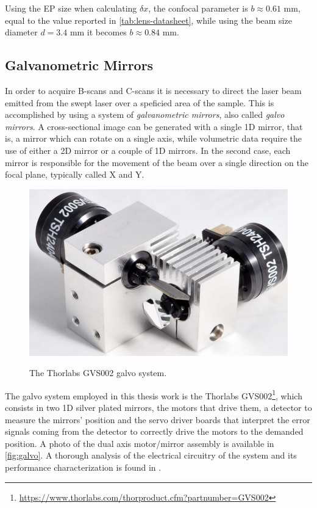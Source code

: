  
 Using the EP size when calculating $\delta x$, the confocal parameter is $b \approx 0.61$ mm, equal to the value reported in \autoref{tab:lens-datasheet}, while using the beam size diameter $d = 3.4$ mm it becomes $b \approx 0.84$ mm. 
 
 

\subsection{Galvanometric Mirrors}

In order to acquire B-scans and C-scans it is necessary to direct the laser beam emitted from the swept laser over a speficied area of the sample. This is accomplished by using a system of \emph{galvanometric mirrors}, also called \emph{galvo mirrors}. A cross-sectional image can be generated with a single 1D mirror, that is, a mirror which can rotate on a single axis, while volumetric data require the use of either a 2D mirror or a couple of 1D mirrors. In the second case, each mirror is responsible for the movement of the beam over a single direction on the focal plane, typically called X and Y. 

\begin{figure}[bth]
	\myfloatalign
	{\includegraphics[width=0.6\linewidth]{gfx/ch3/galvo}}
	\caption{The Thorlabs GVS002 galvo system.}\label{fig:galvo}
\end{figure}

The galvo system employed in this thesis work is the Thorlabs GVS002\footnote{\url{https://www.thorlabs.com/thorproduct.cfm?partnumber=GVS002}}, which consists in two 1D silver plated mirrors, the motors that drive them, a detector to measure the mirrors' position  and the servo driver boards that interpret the error signals coming from the detector to correctly drive the motors to the demanded position. A photo of the dual axis motor/mirror assembly is available in \autoref{fig:galvo}. A thorough analysis of the electrical circuitry of the system and its performance characterization is found in \cite{Calabrese2017}. 

